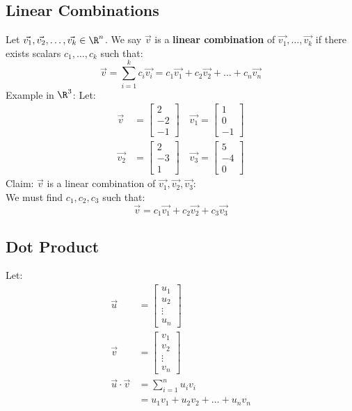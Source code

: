 \documentclass{math}
\begin{document}
\subsection*{Linear Combinations}
Let \( \vec{v_1},\vec{v_2},\dots,\vec{v_k}\in\R^n \). We say
\( \vec{v} \) is a \textbf{linear combination} of
\( \vec{v_1},\dots,\vec{v_k} \) if there exists scalars
\( c_1,\dots,c_k \) such that:
\[ \vec{v} = \sum_{i=1}^kc_i\vec{v_i} =
  c_1\vec{v_1}+c_2\vec{v_2}+\dots+c_n\vec{v_n} \]
Example in \( \R^3 \):
Let:
\begin{align*}
  \vec{v} &=
    \begin{bmatrix}
      2 \\ -2 \\ -1
    \end{bmatrix} \quad
  \vec{v_1} =
    \begin{bmatrix}
      1 \\ 0 \\ -1
    \end{bmatrix} \\
  \vec{v_2} &=
    \begin{bmatrix}
      2 \\ -3 \\ 1
    \end{bmatrix} \quad
  \vec{v_3} =
    \begin{bmatrix}
      5 \\ -4 \\ 0
    \end{bmatrix}
\end{align*}
Claim: \( \vec{v} \) is a linear combination of
\( \vec{v_1},\vec{v_2},\vec{v_3} \): \\
We must find \( c_1,c_2,c_3 \) such that:
\[ \vec{v} = c_1\vec{v_1}+c_2\vec{v_2}+c_3\vec{v_3} \]

\subsection*{Dot Product}
Let:
\begin{align*}
  \vec{u} &=
    \begin{bmatrix}
      u_1 \\ u_2 \\ \vdots \\ u_n
    \end{bmatrix} \\
  \vec{v} &=
    \begin{bmatrix}
      v_1 \\ v_2 \\ \vdots \\ v_n
    \end{bmatrix} \\
  \vec{u}\cdot\vec{v} &= \sum_{i=1}^nu_iv_i \\
  &= u_1v_1+u_2v_2+\dots+u_nv_n
\end{align*}
\end{document}
